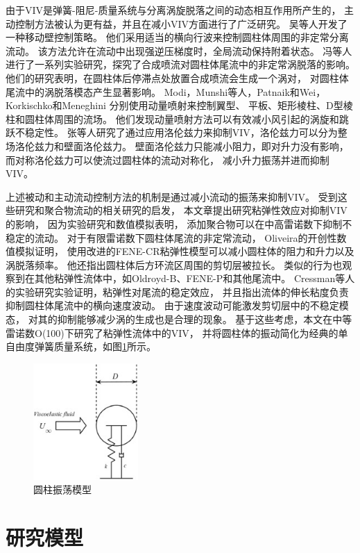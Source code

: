 \documentclass[UTF8,zihao=5]{ctexart} %
\begin{document}
由于VIV是弹簧-阻尼-质量系统与分离涡旋脱落之间的动态相互作用所产生的，
主动控制方法被认为更有益，并且在减小VIV方面进行了广泛研究。
吴等人开发了一种移动壁控制策略。
他们采用适当的横向行波来控制圆柱体周围的非定常分离流动。
该方法允许在流动中出现强逆压梯度时，全局流动保持附着状态。
冯等人进行了一系列实验研究，探究了合成喷流对圆柱体尾流中的非定常涡脱落的影响。
他们的研究表明，在圆柱体后停滞点处放置合成喷流会生成一个涡对，
对圆柱体尾流中的涡脱落模态产生显著影响。
Modi，Munshi等人，Patnaik和Wei，Korkischko和Meneghini 分别使用动量喷射来控制翼型、
平板、矩形棱柱、D型棱柱和圆柱体周围的流场。
他们发现动量喷射方法可以有效减小风引起的涡旋和跳跃不稳定性。
张等人研究了通过应用洛伦兹力来抑制VIV，洛伦兹力可以分为整场洛伦兹力和壁面洛伦兹力。
壁面洛伦兹力只能减小阻力，即对升力没有影响，而对称洛伦兹力可以使流过圆柱体的流动对称化，
减小升力振荡并进而抑制VIV。

上述被动和主动流动控制方法的机制是通过减小流动的振荡来抑制VIV。
受到这些研究和聚合物流动的相关研究的启发，
本文章提出研究粘弹性效应对抑制VIV的影响，
因为实验研究和数值模拟表明，
添加聚合物可以在中高雷诺数下抑制不稳定的流动。
对于有限雷诺数下圆柱体尾流的非定常流动，
Oliveira的开创性数值模拟证明，
使用改进的FENE-CR粘弹性模型可以减小圆柱体的阻力和升力以及涡脱落频率。
他还指出圆柱体后方环流区周围的剪切层被拉长。
类似的行为也观察到在其他粘弹性流体中，如Oldroyd-B、FENE-P和其他尾流中。
Cressman等人的实验研究实验证明，粘弹性对尾流的稳定效应，
并且指出流体的伸长粘度负责抑制圆柱体尾流中的横向速度波动。
由于速度波动可能激发剪切层中的不稳定模态，
对其的抑制能够减少涡的生成也是合理的现象。
基于这些考虑，本文在中等雷诺数O(100)下研究了粘弹性流体中的VIV，
并将圆柱体的振动简化为经典的单自由度弹簧质量系统，如图\ref{fig:1}所示。
\begin{figure}[H]
    \centering
    \includegraphics[width=4cm]{fig1.jpg}
    \caption{圆柱振荡模型}
    \label{fig:1}
\end{figure}

\section{研究模型}
\end{document}
